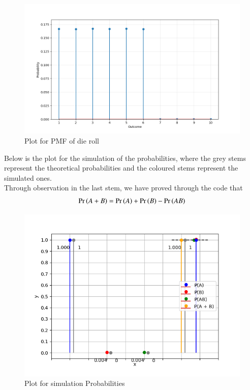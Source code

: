 \documentclass[journal]{IEEEtran}
\begin{document}
\begin{figure}[ht]
	\centering
	\includegraphics[width=\columnwidth]{figs/figure2.png}
	\caption{Plot for PMF of die roll}
\end{figure}

Below is the plot for the simulation of the probabilities, where the grey stems represent the theoretical probabilities and the coloured stems represent the simulated ones.\\
Through observation in the last stem, we have proved through the code that
\begin{align}
	\Pr\left(A + B\right) = \Pr\left(A\right) + \Pr\left(B\right) - \Pr\left(AB\right)
\end{align}

\begin{figure}[ht]
	\centering
	\includegraphics[width=\columnwidth]{figs/figure1.png}
        \caption{Plot for simulation Probabilities}
\end{figure}
\end{document}
